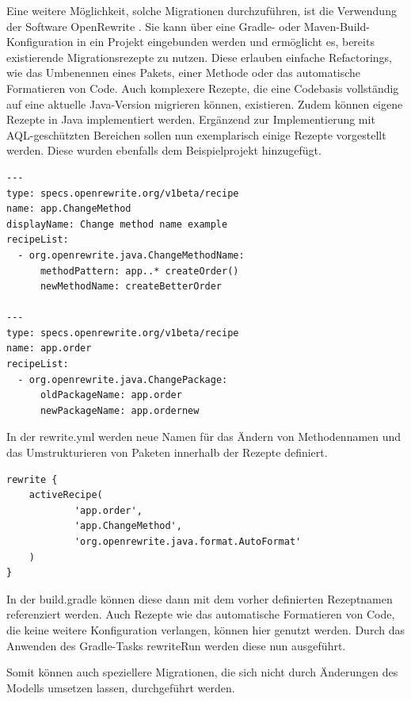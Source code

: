 Eine weitere Möglichkeit, solche Migrationen durchzuführen, ist die Verwendung der Software OpenRewrite \cite{rewrite}. Sie kann über eine Gradle- oder Maven-Build-Konfiguration in ein Projekt eingebunden werden und ermöglicht es, bereits existierende Migrationsrezepte zu nutzen. Diese erlauben einfache Refactorings, wie das Umbenennen eines Pakets, einer Methode oder das automatische Formatieren von Code. Auch komplexere Rezepte, die eine Codebasis vollständig auf eine aktuelle Java-Version migrieren können, existieren. Zudem können eigene Rezepte in Java implementiert werden. Ergänzend zur Implementierung mit AQL-geschützten Bereichen sollen nun exemplarisch einige Rezepte vorgestellt werden. Diese wurden ebenfalls dem Beispielprojekt hinzugefügt.

\begin{lstlisting}[caption=OpenRewrite Rezepte]
---
type: specs.openrewrite.org/v1beta/recipe
name: app.ChangeMethod
displayName: Change method name example
recipeList:
  - org.openrewrite.java.ChangeMethodName:
      methodPattern: app..* createOrder()
      newMethodName: createBetterOrder
      
---
type: specs.openrewrite.org/v1beta/recipe
name: app.order
recipeList:
  - org.openrewrite.java.ChangePackage:
      oldPackageName: app.order
      newPackageName: app.ordernew
\end{lstlisting}

In der rewrite.yml werden neue Namen für das Ändern von Methodennamen und das Umstrukturieren von Paketen innerhalb der Rezepte definiert.

\newpage

\begin{lstlisting}[caption=Anwenden von OpenRewrite Rezepten]
rewrite {
    activeRecipe(
            'app.order',
            'app.ChangeMethod',
            'org.openrewrite.java.format.AutoFormat'
    )
}
\end{lstlisting}

In der build.gradle können diese dann mit dem vorher definierten Rezeptnamen referenziert werden. Auch Rezepte wie das automatische Formatieren von Code, die keine weitere Konfiguration verlangen, können hier genutzt werden. Durch das Anwenden des Gradle-Tasks \glqq rewriteRun\grqq{} werden diese nun ausgeführt.

Somit können auch speziellere Migrationen, die sich nicht durch Änderungen des Modells umsetzen lassen, durchgeführt werden.
